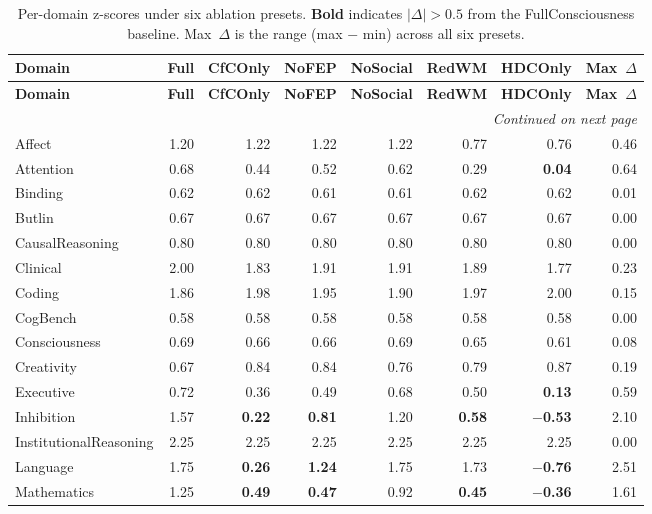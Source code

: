 \documentclass[10pt,landscape]{article}
\begin{document}
\renewcommand{\arraystretch}{1.15}
\begin{longtable}{@{}lrrrrrrr@{}}
\caption{Per-domain z-scores under six ablation presets. \textbf{Bold} indicates $|\Delta| > 0.5$ from the FullConsciousness baseline. Max~$\Delta$ is the range (max $-$ min) across all six presets.} \label{tab:s5} \\
\toprule
\textbf{Domain} & \textbf{Full} & \textbf{CfCOnly} & \textbf{NoFEP} & \textbf{NoSocial} & \textbf{RedWM} & \textbf{HDCOnly} & \textbf{Max~$\Delta$} \\
\midrule
\endfirsthead
\toprule
\textbf{Domain} & \textbf{Full} & \textbf{CfCOnly} & \textbf{NoFEP} & \textbf{NoSocial} & \textbf{RedWM} & \textbf{HDCOnly} & \textbf{Max~$\Delta$} \\
\midrule
\endhead
\midrule
\multicolumn{8}{r}{\emph{Continued on next page}} \\
\endfoot
\bottomrule
\endlastfoot
Affect & 1.20 & 1.22 & 1.22 & 1.22 & 0.77 & 0.76 & 0.46 \\
Attention & 0.68 & 0.44 & 0.52 & 0.62 & 0.29 & \textbf{0.04} & 0.64 \\
Binding & 0.62 & 0.62 & 0.61 & 0.61 & 0.62 & 0.62 & 0.01 \\
Butlin & 0.67 & 0.67 & 0.67 & 0.67 & 0.67 & 0.67 & 0.00 \\
CausalReasoning & 0.80 & 0.80 & 0.80 & 0.80 & 0.80 & 0.80 & 0.00 \\
Clinical & 2.00 & 1.83 & 1.91 & 1.91 & 1.89 & 1.77 & 0.23 \\
Coding & 1.86 & 1.98 & 1.95 & 1.90 & 1.97 & 2.00 & 0.15 \\
CogBench & 0.58 & 0.58 & 0.58 & 0.58 & 0.58 & 0.58 & 0.00 \\
Consciousness & 0.69 & 0.66 & 0.66 & 0.69 & 0.65 & 0.61 & 0.08 \\
Creativity & 0.67 & 0.84 & 0.84 & 0.76 & 0.79 & 0.87 & 0.19 \\
Executive & 0.72 & 0.36 & 0.49 & 0.68 & 0.50 & \textbf{0.13} & 0.59 \\
Inhibition & 1.57 & \textbf{0.22} & \textbf{0.81} & 1.20 & \textbf{0.58} & \textbf{$-$0.53} & 2.10 \\
InstitutionalReasoning & 2.25 & 2.25 & 2.25 & 2.25 & 2.25 & 2.25 & 0.00 \\
Language & 1.75 & \textbf{0.26} & \textbf{1.24} & 1.75 & 1.73 & \textbf{$-$0.76} & 2.51 \\
Mathematics & 1.25 & \textbf{0.49} & \textbf{0.47} & 0.92 & \textbf{0.45} & \textbf{$-$0.36} & 1.61 \\

\end{longtable}
\end{document}
